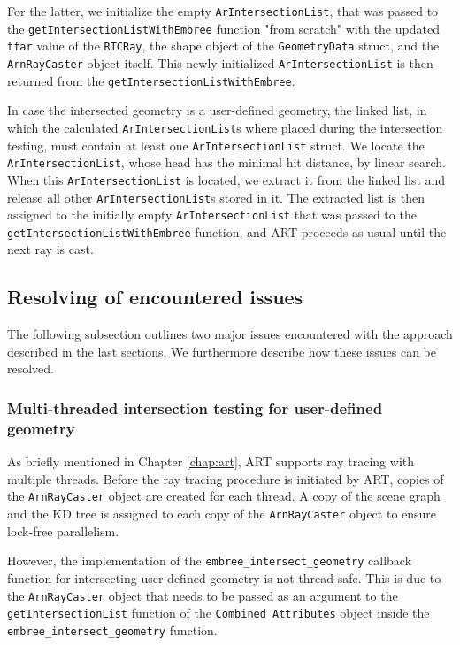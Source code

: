 For the latter, we initialize the empty \texttt{ArIntersectionList}, that was passed to the \texttt{getIntersectionListWithEmbree} function "from scratch" with the updated \texttt{tfar} value of the \texttt{RTCRay}, the shape object of the \texttt{GeometryData} struct, and the \texttt{ArnRayCaster} object itself. This newly initialized \texttt{ArIntersectionList} is then returned from the \texttt{getIntersectionListWithEmbree}.

In case the intersected geometry is a user-defined geometry, the linked list, in which the calculated \texttt{ArIntersectionList}s where placed during the intersection testing, must contain at least one \texttt{ArIntersectionList} struct. We locate the \texttt{ArIntersectionList}, whose head has the minimal hit distance, by linear search. When this \texttt{ArIntersectionList} is located, we extract it from the linked list and release all other \texttt{ArIntersectionList}s stored in it. The extracted list is then assigned to the initially empty \texttt{ArIntersectionList} that was passed to the \texttt{getIntersectionListWithEmbree} function, and ART proceeds as usual until the next ray is cast.


\subsection{Resolving of encountered issues}
\label{sec:issues_user}
The following subsection outlines two major issues encountered with the approach described in the last sections. We furthermore describe how these issues can be resolved.

\subsubsection{Multi-threaded intersection testing for user-defined geometry}
As briefly mentioned in Chapter \ref{chap:art}, ART supports ray tracing with multiple threads.
Before the ray tracing procedure is initiated by ART, copies of the \texttt{ArnRayCaster} object are created for each thread. A copy of the scene graph and the KD tree is assigned to each copy of the \texttt{ArnRayCaster} object to ensure lock-free parallelism.

However, the implementation of the \texttt{embree\_intersect\_geometry} callback function for intersecting user-defined geometry is not thread safe. This is due to the \texttt{ArnRayCaster} object that needs to be passed as an argument to the \texttt{getIntersectionList} function of the \texttt{Combined Attributes} object inside the \texttt{embree\_intersect\_geometry} function.

